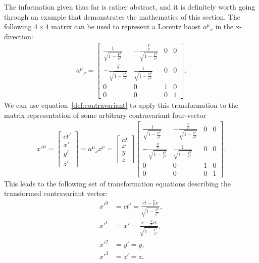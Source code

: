\documentclass[titlepage,letterpaper,onecolumn,11pt,final]{report}
\numberwithin{equation}{section}
\numberwithin{figure}{section}
\begin{document}
The information given thus far is rather abstract, and it is definitely worth going through an example that demonstrates the mathematics of this section. The following $4 \times 4$ matrix can be used to represent a Lorentz boost ${a^{\mu}}_{\nu}$ in the x-direction:
\begin{gather}
{a^{\mu}}_{\nu} =
	\begin{bmatrix}
	 \frac{1}{\sqrt{1-\frac{V^2}{c^2}}} & -\frac{\frac{V}{c}}{\sqrt{1-\frac{V^2}{c^2}}} & 0 & 0 \\[10pt]
	 -\frac{\frac{V}{c}}{\sqrt{1-\frac{V^2}{c^2}}} & \frac{1}{\sqrt{1-\frac{V^2}{c^2}}} & 0 & 0 \\[10pt]
	 0 & 0 & 1 & 0 \\[10pt]
	 0 & 0 & 0 & 1
	\end{bmatrix}  .
\end{gather}
%
We can use equation~\ref{def:contravariant} to apply this transformation to the matrix representation of some arbitrary contravariant four-vector
\begin{gather}
	{x'}^{\mu} = 
	\begin{bmatrix}
	 ct' \\[13pt]
	 x' \\[13pt]
	 y' \\[13pt]
	 z' 
	\end{bmatrix}
	=
	{a^{\mu}}_{\nu} x^{\nu} =
	\begin{bmatrix}
	 ct \\[13pt]
	 x \\[13pt]
	 y \\[13pt]
	 z 
	\end{bmatrix}
	\begin{bmatrix}
	 \frac{1}{\sqrt{1-\frac{V^2}{c^2}}} & -\frac{\frac{V}{c}}{\sqrt{1-\frac{V^2}{c^2}}} & 0 & 0 \\[10pt]
	 -\frac{\frac{V}{c}}{\sqrt{1-\frac{V^2}{c^2}}} & \frac{1}{\sqrt{1-\frac{V^2}{c^2}}} & 0 & 0 \\[10pt]
	 0 & 0 & 1 & 0 \\[10pt]
	 0 & 0 & 0 & 1
	\end{bmatrix} .
\end{gather}
%
This leads to the following set of transformation equations describing the transformed contravariant vector:
\begin{subequations}
\begin{align}
 {x'}^{0} &= ct'= \frac{ct - \frac{V}{c}x}{\sqrt{1-\frac{V^2}{c^2}}}, \\
 {x'}^{1} &= x' = \frac{x - \frac{V}{c}ct}{\sqrt{1-\frac{V^2}{c^2}}}, \\
 {x'}^{2} &= y' = y, \\
 {x'}^{3} &= z' = z.
\end{align}
\end{subequations}
\end{document}

